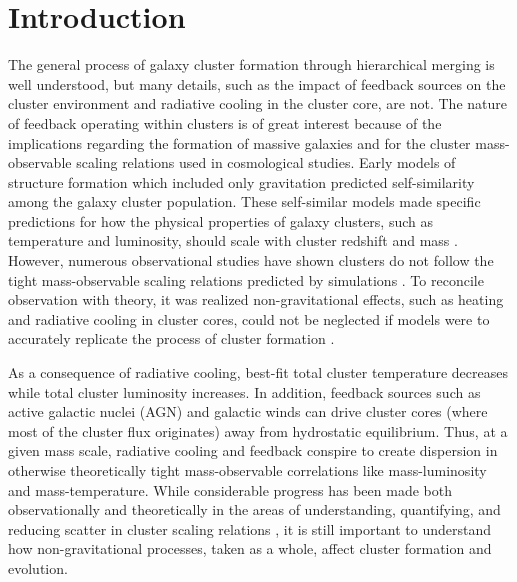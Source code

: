 \section{Introduction}
\label{sec:entsuppintro}

The general process of galaxy cluster formation through hierarchical
merging is well understood, but many details, such as the impact of
feedback sources on the cluster environment and radiative cooling in
the cluster core, are not. The nature of feedback operating within
clusters is of great interest because of the implications regarding
the formation of massive galaxies and for the cluster mass-observable
scaling relations used in cosmological studies. Early models of
structure formation which included only gravitation predicted
self-similarity among the galaxy cluster population. These
self-similar models made specific predictions for how the physical
properties of galaxy clusters, such as temperature and luminosity,
should scale with cluster redshift and mass \citep{kaiser86, kaiser91,
  1991ApJ...383...95E, nfw1, nfw2, 1996ApJ...469..494E,
  1997MNRAS.292..289E, 1997ApJ...480...36T, 1998ApJ...503..569E,
  1998ApJ...495...80B}. However, numerous observational studies have
shown clusters do not follow the tight mass-observable scaling
relations predicted by simulations \citep{edge91, 1998MNRAS.297L..57A,
  1998ApJ...504...27M, 1999MNRAS.305..631A, 1999ApJ...520...78H,
  2000ApJ...536...73N, 2001A&A...368..749F}. To reconcile observation
with theory, it was realized non-gravitational effects, such as
heating and radiative cooling in cluster cores, could not be neglected
if models were to accurately replicate the process of cluster
formation \citep[\eg][]{kaiser91, 1991ApJ...383...95E,
  2000ApJ...532...17L, voitbryan, 2002MNRAS.336..409B}.

As a consequence of radiative cooling, best-fit total cluster
temperature decreases while total cluster luminosity increases. In
addition, feedback sources such as active galactic nuclei (AGN) and
galactic winds can drive cluster cores (where most of the cluster flux
originates) away from hydrostatic equilibrium. Thus, at a given mass
scale, radiative cooling and feedback conspire to create dispersion in
otherwise theoretically tight mass-observable correlations like
mass-luminosity and mass-temperature. While considerable progress has
been made both observationally and theoretically in the areas of
understanding, quantifying, and reducing scatter in cluster scaling
relations \citep{1996ApJ...458...27B, 2005ApJ...624..606J, kravtsov06,
2006ApJ...639...64O, nagai07, VV08}, it is still important to
understand how non-gravitational processes, taken as a whole, affect
cluster formation and evolution.

